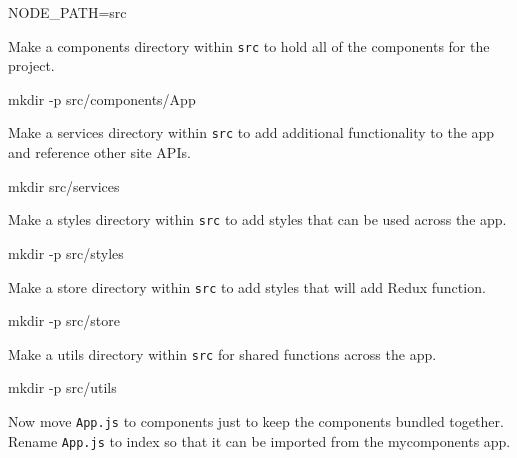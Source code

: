 \documentclass[]{book}
\newenvironment{Shaded}{\begin{snugshade}}{\end{snugshade}}
\newcommand{\FunctionTok}[1]{\textcolor[rgb]{0.00,0.00,0.00}{#1}}
\newcommand{\VariableTok}[1]{\textcolor[rgb]{0.00,0.00,0.00}{#1}}
\newcommand{\NormalTok}[1]{#1}
\begin{document}
\begin{Shaded}
\begin{Highlighting}[]
\VariableTok{NODE_PATH=}\NormalTok{src}
\end{Highlighting}
\end{Shaded}

Make a components directory within \texttt{src} to hold all of the
components for the project.

\begin{Shaded}
\begin{Highlighting}[]
\FunctionTok{mkdir}\NormalTok{ -p src/components/App}
\end{Highlighting}
\end{Shaded}

Make a services directory within \texttt{src} to add additional
functionality to the app and reference other site APIs.

\begin{Shaded}
\begin{Highlighting}[]
\FunctionTok{mkdir}\NormalTok{ src/services}
\end{Highlighting}
\end{Shaded}

Make a styles directory within \texttt{src} to add styles that can be
used across the app.

\begin{Shaded}
\begin{Highlighting}[]
\FunctionTok{mkdir}\NormalTok{ -p src/styles}
\end{Highlighting}
\end{Shaded}

Make a store directory within \texttt{src} to add styles that will add
Redux function.

\begin{Shaded}
\begin{Highlighting}[]
\FunctionTok{mkdir}\NormalTok{ -p src/store}
\end{Highlighting}
\end{Shaded}

Make a utils directory within \texttt{src} for shared functions across
the app.

\begin{Shaded}
\begin{Highlighting}[]
\FunctionTok{mkdir}\NormalTok{ -p src/utils}
\end{Highlighting}
\end{Shaded}

Now move \texttt{App.js} to components just to keep the components
bundled together. Rename \texttt{App.js} to index so that it can be
imported from the mycomponents app.
\end{document}
